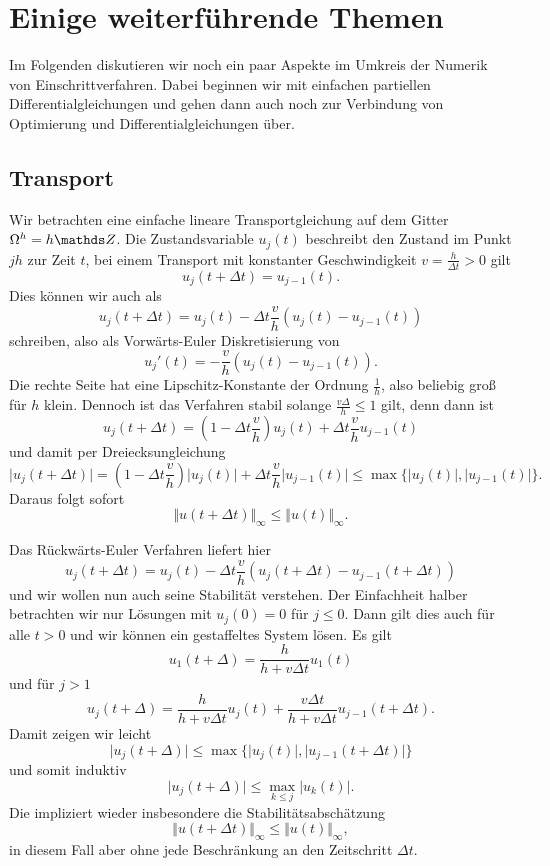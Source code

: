 \section{Einige weiterführende Themen}

Im Folgenden diskutieren wir noch ein paar Aspekte im Umkreis der Numerik von Einschrittverfahren. Dabei beginnen wir mit einfachen partiellen Differentialgleichungen und gehen dann auch noch zur Verbindung von Optimierung und Differentialgleichungen über. 

\subsection{Transport}

Wir betrachten eine einfache lineare Transportgleichung auf dem Gitter $\Omega^h = h \Z$. Die Zustandsvariable $u_j(t)$ beschreibt den Zustand im Punkt $jh$ zur Zeit $t$, bei einem Transport mit konstanter Geschwindigkeit $v=\frac{h}{\Delta t} > 0$ gilt
$$ u_j(t+ \Delta t) = u_{j-1}(t). $$
Dies können wir auch als 
$$  u_j(t+ \Delta t) = u_j(t) - \Delta t \frac{v}h (u_j(t) - u_{j-1}(t)) $$
schreiben, also als Vorwärts-Euler Diskretisierung von
$$ u_j'(t) = - \frac{v}h (u_j(t) - u_{j-1}(t)).  $$
Die rechte Seite hat eine Lipschitz-Konstante der Ordnung $\frac{1}h$, also beliebig gro{\ss} für $h$ klein. Dennoch ist das Verfahren stabil solange $\frac{v \Delta}h \leq 1$ gilt, denn dann ist
$$ u_j(t+\Delta t) = (1 - \Delta t \frac{v}h)  u_j(t) + \Delta t \frac{v}h u_{j-1}(t) $$ 
und damit per Dreiecksungleichung
$$ \vert u_j(t+\Delta t) \vert = (1 - \Delta t \frac{v}h) \vert u_j(t) \vert+ \Delta t \frac{v}h \vert u_{j-1}(t) \vert 
\leq \max\{ \vert u_j(t) \vert,\vert u_{j-1}(t) \vert  \} .$$ 
Daraus folgt sofort 
$$ \Vert u (t+ \Delta t) \Vert_\infty \leq \Vert u (t ) \Vert_\infty. $$

Das Rückwärts-Euler Verfahren liefert hier
$$    u_j(t+ \Delta t) = u_j(t) - \Delta t \frac{v}h (u_j(t+\Delta t) - u_{j-1}(t+ \Delta t)) $$
und wir wollen nun auch seine Stabilität verstehen. Der Einfachheit halber betrachten wir nur Lösungen mit $u_j(0) = 0$ für $j \leq 0$. Dann gilt dies auch für alle $t > 0$ und wir können ein gestaffeltes System lösen. Es gilt
$$ u_1(t+\Delta) = \frac{h}{h+v\Delta t} u_1(t) $$
und für $j > 1$
$$  u_j(t+\Delta) = \frac{h}{h+v\Delta t} u_j(t) +  \frac{v\Delta t}{h+v\Delta t} u_{j-1}(t+\Delta t). $$
Damit zeigen wir leicht 
$$ \vert u_j(t+\Delta) \vert \leq \max\{ \vert u_j(t) \vert,  \vert u_{j-1}(t+\Delta t) \vert\} $$
und somit induktiv
$$ \vert u_j(t+\Delta) \vert \leq \max_{k \leq j} \vert u_k(t) \vert. $$
Die impliziert wieder insbesondere die Stabilitätsabschätzung 
$$ \Vert u (t+ \Delta t) \Vert_\infty \leq \Vert u (t ) \Vert_\infty, $$
in diesem Fall aber ohne jede Beschränkung an den Zeitschritt $\Delta t$.

